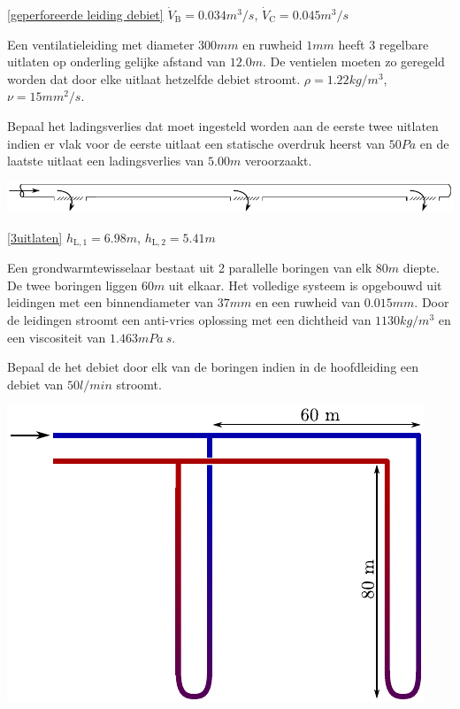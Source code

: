 \begin{antwoord}{\ref{geperforeerde leiding debiet}}
	$\dot{V}_\mathrm{B} = 0.034\unit{m^3/s}$, $\dot{V}_\mathrm{C} = 0.045\unit{m^3/s}$
\end{antwoord}
\begin{toepassing}
	\label{3uitlaten}
Een ventilatieleiding met diameter $300\unit{mm}$ en ruwheid $1\unit{mm}$ heeft 3 regelbare uitlaten op onderling gelijke afstand van $12.0\unit{m}$. De ventielen moeten zo geregeld worden dat door elke uitlaat hetzelfde debiet stroomt. $\rho = 1.22\unit{kg/m^3}$, $\nu = 15\unit{mm^2/s}$.
	
Bepaal het ladingsverlies dat moet ingesteld worden aan de eerste twee uitlaten indien er vlak voor de eerste uitlaat een statische overdruk heerst van $50\unit{Pa}$ en de laatste uitlaat een ladingsverlies van $5.00\unit{m}$ veroorzaakt.

	\centering
	\includegraphics{fig/leidingstelsels/3uitlaten}
\end{toepassing}
\begin{antwoord}{\ref{3uitlaten}}
	$h_\mathrm{L,1} = 6.98\unit{m}$, $h_\mathrm{L,2} = 5.41\unit{m}$
\end{antwoord}
\begin{toepassing}[*]
	\label{grondwarmtewisselaar}
Een grondwarmtewisselaar bestaat uit 2 parallelle boringen van elk $80\unit{m}$ diepte. De twee boringen liggen $60\unit{m}$ uit elkaar. Het volledige systeem is opgebouwd uit leidingen met een binnendiameter van $37\unit{mm}$ en een ruwheid van $0.015\unit{mm}$. Door de leidingen stroomt een anti-vries oplossing met een dichtheid van $1130\unit{kg/m^3}$ en een viscositeit van $1.463\unit{mPa\ s}$.
	
Bepaal de het debiet door elk van de boringen indien in de hoofdleiding een debiet van $50\unit{l/min}$ stroomt.

	\centering	
	\includegraphics{fig/leidingstelsels/grondwarmtewisselaar}
\end{toepassing}
